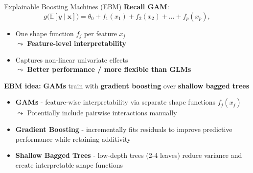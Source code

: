 \documentclass[10pt,compress,t,notes=noshow, xcolor=table]{beamer}
\begin{document}
\begin{frame}{Explainable Boosting Machines (EBM)}
\textbf{Recall GAM}: 
$$
g\big(\mathbb{E}[y \mid \mathbf{x}]\big) = \theta_0 + f_1(x_{1}) + f_2(x_{2}) + \ldots + f_p(x_{p}),
$$

\begin{itemize}
    \item One shape function $f_j$ per feature $x_j$\\ $\leadsto$ \textbf{Feature-level interpretability}
    \item Captures non-linear univariate effects\\ $\leadsto$ \textbf{Better performance / more flexible than GLMs}
\end{itemize}

\medskip

\textbf{EBM idea:} \textbf{GAMs} train with \textbf{gradient boosting} over \textbf{shallow bagged trees}
\begin{itemize}
    \item \textbf{GAMs} - feature-wise interpretability via separate shape functions $f_j(x_j)$\\
    $\leadsto$ Potentially include pairwise interactions manually
    \item \textbf{Gradient Boosting} - incrementally fits residuals to improve predictive performance while retaining additivity
    \item \textbf{Shallow Bagged Trees} - low-depth trees (2-4 leaves) reduce variance and create interpretable shape functions
\end{itemize}



\end{frame}
\end{document}
